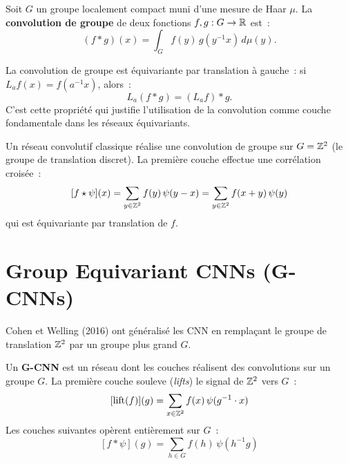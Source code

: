 \begin{definition}
Soit $G$ un groupe localement compact muni d'une mesure de Haar $\mu$. La
\textbf{convolution de groupe} de deux fonctions $f, g: G \to \mathbb{R}$ est~:
\[
    (f * g)(x) = \int_G f(y)\, g(y^{-1}x)\, d\mu(y).
\]
\end{definition}

\begin{proposition}
La convolution de groupe est \'equivariante par translation \`a gauche~: si
$L_a f(x) = f(a^{-1}x)$, alors~:
\[
    L_a(f * g) = (L_a f) * g.
\]
C'est cette propri\'et\'e qui justifie l'utilisation de la convolution comme
couche fondamentale dans les r\'eseaux \'equivariants.
\end{proposition}

\begin{theoreme}
Un r\'eseau convolutif classique r\'ealise une convolution de groupe sur
$G = \mathbb{Z}^2$ (le groupe de translation discret). La premi\`ere couche effectue
une corr\'elation crois\'ee~:
\[
    [f \star \psi](x) = \sum_{y \in \mathbb{Z}^2} f(y)\, \psi(y - x)
    = \sum_{y \in \mathbb{Z}^2} f(x + y)\, \psi(y)
\]
qui est \'equivariante par translation de $f$.
\end{theoreme}

\section{Group Equivariant CNNs (G-CNNs)}

Cohen et Welling (2016) ont g\'en\'eralis\'e les CNN en rempla\c{c}ant le
groupe de translation $\mathbb{Z}^2$ par un groupe plus grand $G$.

\begin{definition}[G-CNN]
Un \textbf{G-CNN} est un r\'eseau dont les couches r\'ealisent des convolutions
sur un groupe $G$. La premi\`ere couche \og souleve \fg (\textit{lifts}) le
signal de $\mathbb{Z}^2$ vers $G$~:
\[
    [\text{lift}(f)](g) = \sum_{x \in \mathbb{Z}^2} f(x)\, \psi(g^{-1} \cdot x)
\]
Les couches suivantes op\`erent enti\`erement sur $G$~:
\[
    [f * \psi](g) = \sum_{h \in G} f(h)\, \psi(h^{-1}g)
\]
\end{definition}

